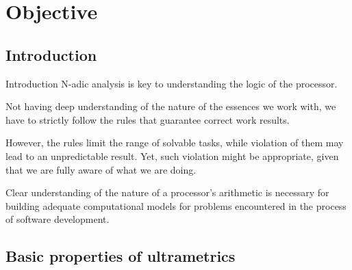 


\section{Objective}

\subsection{Introduction}

\begin{frame}{Introduction}
N-adic analysis is key to understanding the logic of the processor.  
\pause

Not having deep understanding of the nature of the essences we work with, we have to strictly follow the rules that guarantee correct work results.
\pause

 However, the rules limit the range of solvable tasks, while violation of them may lead to an unpredictable result. Yet, such violation might be appropriate, given that we are fully aware of what we are doing.
\pause

Clear understanding of the nature of a processor's arithmetic is necessary for
building adequate computational models for problems encountered in the process of software development.
\end{frame}


\subsection{Basic properties of ultrametrics}

